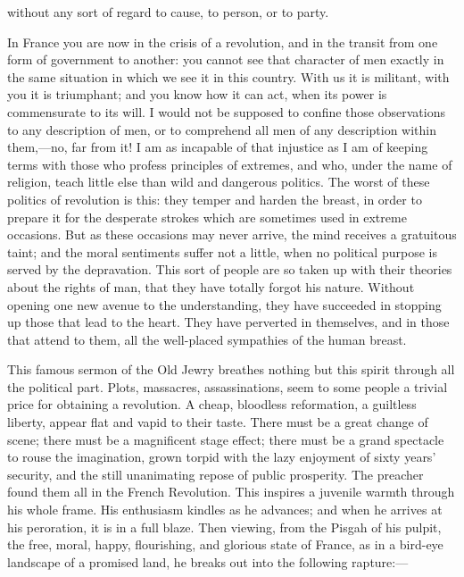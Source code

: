 without any sort of regard to cause, to person, or to party.

In France you are now in the crisis of a revolution, and in the transit from one form of government to another: you cannot see that character of men exactly in the same situation in which we see it in this country. With us it is militant, with you it is triumphant; and you know how it can act, when its power is commensurate to its will. I would not be supposed to confine those observations to any description of men, or to comprehend all men of any description within them,—no, far from it! I am as incapable of that injustice as I am of keeping terms with those who profess principles of extremes, and who, under the name of religion, teach little else than wild and dangerous politics. The worst of these politics of revolution is this: they temper and harden the breast, in order to prepare it for the desperate strokes which are sometimes used in extreme occasions. But as these occasions may never arrive, the mind receives a gratuitous taint; and the moral sentiments suffer not a little, when no political purpose is served by the depravation. This sort of people are so taken up with their theories about the rights of man, that they have totally forgot his nature. Without opening one new avenue to the understanding, they have succeeded in stopping up those that lead to the heart. They have perverted in themselves, and in those that attend to them, all the well-placed sympathies of the human breast.

This famous sermon of the Old Jewry breathes nothing but this spirit through all the political part. Plots, massacres, assassinations, seem to some people a trivial price for obtaining a revolution. A cheap, bloodless reformation, a guiltless liberty, appear flat and vapid to their taste. There must be a great change of scene; there must be a magnificent stage effect; there must be a grand spectacle to rouse the imagination, grown torpid with the lazy enjoyment of sixty years' security, and the still unanimating repose of public prosperity. The preacher found them all in the French Revolution. This inspires a juvenile warmth through his whole frame. His enthusiasm kindles as he advances; and when he arrives at his peroration, it is in a full blaze. Then viewing, from the Pisgah of his pulpit, the free, moral, happy, flourishing, and glorious state of France, as in a bird-eye landscape of a promised land, he breaks out into the following rapture:—

